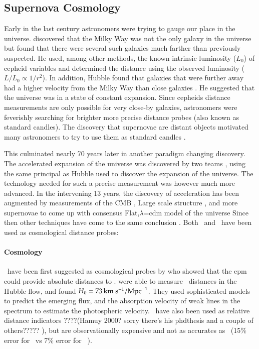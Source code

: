 \subsection{Supernova Cosmology}
Early in the last century astronomers were trying to gauge our place in the universe. \citet{1926ApJ....64..321H} discovered that the Milky Way was not the only galaxy in the universe but found that there were several such galaxies much farther than previously suspected. He used, among other methods, the known intrinsic luminosity ($L_0$) of \gls{cepheid} variables and determined the distance using the observed luminosity ($L/L_0 \propto 1/r^2$).  In addition, Hubble found that galaxies that were further away had a higher velocity from the Milky Way than close galaxies \citep{1929PNAS...15..168H}. He suggested that the universe was in a state of constant expansion. Since \glspl{cepheid} distance measurements are only possible for very close-by galaxies, astronomers were feverishly searching for brighter more precise distance probes (also known as standard candles). The discovery that supernovae are distant objects \citet{1934PNAS...20..254B} motivated many astronomers to try to use them as standard candles \citep{1938ApJ....88..285B, 1960ZA.....49..201V, 1968AJ.....73.1021K,1990A&A...230...81L, 1990AJ....100..530M}. 

This culminated nearly 70 years later in another paradigm changing discovery. The accelerated expansion of the universe was discovered by two teams \citep{1998AJ....116.1009R, 1999ApJ...517..565P}, using the same principal as Hubble used to discover the expansion of the universe. The technology needed for such a precise measurement was however much more advanced. In the intervening 13 years, the discovery of acceleration has been augmented by measurements of the CMB \cite[e.g. WMAP7;][]{2011ApJS..192...18K}, Large scale structure \citep[e.g.][]{2011MNRAS.tmp..951B}, and more supernovae \citep[e.g.]{2011A&A...525A...7A} to come up with consensus Flat,$\lambda$=\gls{cdm} model of the universe \citep[e.g.][]{2011arXiv1104.1444S}
Since then other techniques have come to the same conclusion . Both \sneia\ and \snii\ have been used as cosmological distance probes:

\paragraph{ Cosmology}
\sniip\ have been first suggested as cosmological probes by \citet{1974ApJ...193...27K} who showed that the \gls{epm} could provide absolute distances to \sneii. \cite{1994ApJ...432...42S} were able to measure \snii\ distances in the Hubble flow, and found $H_0 = 73\,\hbox{km s$^{-1}$} / \textrm{Mpc}^{-1}$. They used sophisticated models to predict the emerging flux, and the absorption velocity of weak lines in the spectrum to estimate the photospheric velocity.  \sniip\ have also been used as relative distance indicators ????(Hamuy 2000? sorry there's his phdthesis and a couple of others????? ), but are observationally expensive and not as accurates as \snia\ (15\% error for \snii\  vs 7\% error for \snia\ \citep{2006ApJ...645..841N}).

